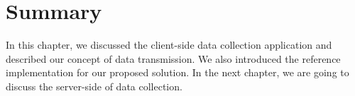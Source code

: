 \section{Summary}

In this chapter, we discussed the client-side data collection application and described our concept of data transmission. We also introduced the reference implementation for our proposed solution. In the next chapter, we are going to discuss the server-side of data collection.
%